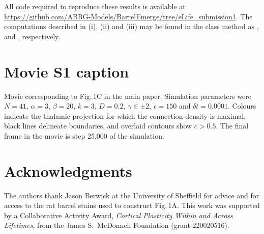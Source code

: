 \documentclass[9pt,lineno]{elife}
\begin{document}
All code required to reproduce these results is available at
\url{https://github.com/ABRG-Models/BarrelEmerge/tree/eLife_submission1}. The
computations described in (i), (ii) and (iii) may be found in the class method
 as ,  and ,
respectively.

\section{Movie S1 caption}

Movie corresponding to Fig.\,1C in the main paper. Simulation parameters were
$N=41$, $\alpha=3$, $\beta=20$, $k=3$, $D=0.2$, $\gamma\in\pm 2$,
$\epsilon=150$ and $\delta{t}=0.0001$. Colours indicate the thalamic
projection for which the connection density is maximal, black lines delineate
boundaries, and overlaid contours show $c>0.5$. The final frame in the movie
is step 25,000 of the simulation.

\section{Acknowledgments}

The authors thank Jason Berwick at the University of Sheffield for advice and
for access to the rat barrel stains used to construct Fig.\,1A. This work was
supported by a Collaborative Activity Award, \emph{Cortical Plasticity Within
  and Across Lifetimes}, from the James S.~McDonnell Foundation (grant
220020516).


\end{document}
